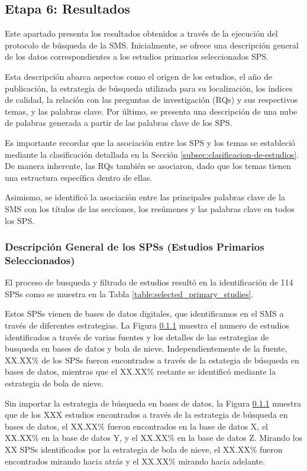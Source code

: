 \subsection{Etapa 6: Resultados}
Este apartado presenta los resultados obtenidos a través de la ejecución del protocolo de búsqueda de la SMS. Inicialmente, se ofrece una descripción general de los datos correspondientes a los estudios primarios seleccionados SPS.

Esta descripción abarca aspectos como el origen de los estudios, el año de publicación, la estrategia de búsqueda utilizada para su localización, los índices de calidad, la relación con las preguntas de investigación (RQs) y sus respectivos temas, y las palabras clave. Por último, se presenta una descripción de una nube de palabras generada a partir de las palabras clave de los SPS.

Es importante recordar que la asociación entre los SPS y los temas se estableció mediante la clasificación detallada en la Sección \ref{subsec:clasificacion-de-estudios}. De manera inherente, las RQs también se asociaron, dado que los temas tienen una estructura específica dentro de ellas.

Asimismo, se identificó la asociación entre las principales palabras clave de la SMS con los títulos de las secciones, los resúmenes y las palabras clave en todos los SPS.

\subsubsection{Descripción General de los SPSs (Estudios Primarios Seleccionados)}
El proceso de busqueda y filtrado de estudios resultó en la identificación de 114 SPSs como se muestra en la Tabla \ref{table:selected_primary_studies}.

Estos SPSs vienen de bases de datos digitales, que identificamos en el SMS a través de diferentes estrategias. La Figura \ref{} muestra el numero de estudios identificados a través de varias fuentes y los detalles de las estrategias de busqueda en bases de datos y bola de nieve. Independientemente de la fuente, XX.XX\% de los SPSs fueron encontrados a través de la estategia de búsqueda en bases de datos, mientras que el XX.XX\% restante se identificó mediante la estrategia de bola de nieve.

Sin importar la estrategia de búsqueda en bases de datos, la Figura \ref{} muestra que de los XXX estudios encontrados a través de la estrategia de búsqueda en bases de datos, el XX.XX\% fueron encontrados en la base de datos X, el XX.XX\% en la base de datos Y, y el XX.XX\% en la base de datos Z. Mirando los XX SPSs identificados por la estrategia de bola de nieve, el XX.XX\% fueron encontrados mirando hacia atrás y el XX.XX\% mirando hacia adelante.

